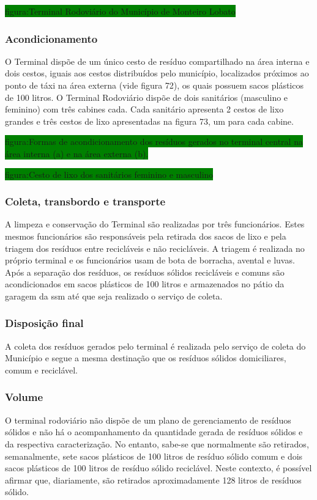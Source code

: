 	\colorbox{green}{figura:Terminal Rodoviário do Município de Monteiro Lobato}
	
	\subsubsection{Acondicionamento}
	O Terminal dispõe de um único cesto de resíduo compartilhado na área interna e dois cestos, iguais aos cestos distribuídos pelo município, localizados próximos ao ponto de táxi na área externa (vide figura 72), os quais possuem sacos plásticos de 100 litros. O Terminal Rodoviário dispõe de dois sanitários (masculino e feminino) com três cabines cada. Cada sanitário apresenta 2 cestos de lixo grandes e três cestos de lixo apresentadas na figura 73, um para cada cabine.
	
	\colorbox{green}{figura:Formas de acondicionamento dos resíduos gerados no terminal central na área interna (a) e na área externa (b).}
	
	\colorbox{green}{figura:Cesto de lixo dos sanitários feminino e masculino}
	
	\subsubsection{Coleta, transbordo e transporte}
	A limpeza e conservação do Terminal são realizadas por três funcionários. Estes mesmos funcionários são responsáveis pela retirada dos sacos de lixo e pela triagem dos resíduos entre recicláveis e não recicláveis. A triagem é realizada no próprio terminal e os funcionários usam de bota de borracha, avental e luvas. Após a separação dos resíduos, os resíduos sólidos recicláveis e comuns são acondicionados em sacos plásticos de 100 litros e armazenados no pátio da garagem da \gls{ssm} até que seja realizado o serviço de coleta.
	
	\subsubsection{Disposição final}
	A coleta dos resíduos gerados pelo terminal é realizada pelo serviço de coleta do Município e segue a mesma destinação que os resíduos sólidos domiciliares, comum e reciclável. 
	
	\subsubsection{Volume}
	O terminal rodoviário não dispõe de um plano de gerenciamento de resíduos sólidos e não há o acompanhamento da quantidade gerada de resíduos sólidos e da respectiva caracterização. No entanto, sabe-se que normalmente são retirados, semanalmente, sete sacos plásticos de 100 litros de resíduo sólido comum e dois sacos plásticos de 100 litros de resíduo sólido reciclável. Neste contexto, é possível afirmar que, diariamente, são retirados aproximadamente 128 litros de resíduos sólido.

